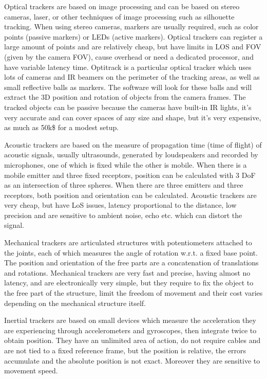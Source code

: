 \documentclass[a4paper]{article}
\begin{document}
Optical trackers are based on image processing and can be based on
stereo cameras, laser, or other techniques of image processing such as
silhouette tracking. When using stereo cameras, markers are usually
required, such as color points (passive markers) or LEDs (active
markers). Optical trackers can register a large amount of points and are
relatively cheap, but have limits in LOS and FOV (given by the camera
FOV), cause overhead or need a dedicated processor, and have variable
latency time. Optitrack is a particular optical tracker which uses lots
of cameras and IR beamers on the perimeter of the tracking areas, as
well as small reflective balls as markers. The software will look for
these balls and will extract the 3D position and rotation of objects
from the camera frames. The tracked objects can be passive because the
cameras have built-in IR lights, it's very accurate and can cover spaces
of any size and shape, but it's very expensive, as much as 50k\$ for a
modest setup.

Acoustic trackers are based on the measure of propagation time (time of
flight) of acoustic signals, usually ultrasounds, generated by
loudspeakers and recorded by microphones, one of which is fixed while
the other is mobile. When there is a mobile emitter and three fixed
receptors, position can be calculated with 3 DoF as an intersection of
three spheres. When there are three emitters and three receptors, both
position and orientation can be calculated. Acoustic trackers are very
cheap, but have LoS issues, latency proportional to the distance, low
precision and are sensitive to ambient noise, echo etc. which can
distort the signal.

Mechanical trackers are articulated structures with potentiometers
attached to the joints, each of which measures the angle of rotation
w.r.t. a fixed base point. The position and orientation of the free
parts are a concatenation of translations and rotations. Mechanical
trackers are very fast and precise, having almost no latency, and are
electronically very simple, but they require to fix the object to the
free part of the structure, limit the freedom of movement and their cost
varies depending on the mechanical structure itself.

Inertial trackers are based on small devices which measure the
acceleration they are experiencing through accelerometers and
gyroscopes, then integrate twice to obtain position. They have an
unlimited area of action, do not require cables and are not tied to a
fixed reference frame, but the position is relative, the errors
accumulate and the absolute position is not exact. Moreover they are
sensitive to movement speed.
\end{document}
